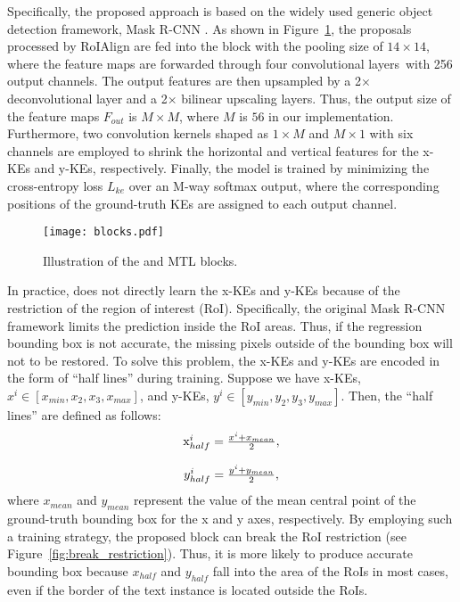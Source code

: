 \def\x{$\times$\xspace}

Specifically, the proposed approach is based on the widely used generic object detection framework, Mask R-CNN \cite{he2017mask}. As shown in Figure~\ref{fig:mtl_blocks}, the proposals processed by RoIAlign are fed into the \Ours block with the pooling size of $14\times 14$, where the feature maps are forwarded through four convolutional layers\ with 256 output channels. The output features are then upsampled by a 2\x deconvolutional layer and a 2\x bilinear upscaling layers. Thus, the output size of the feature maps $F_{out}$ is $M \times M$, where $M$ is $56$ in our implementation. 
Furthermore, two convolution kernels shaped as $1 \times M$ and $M \times 1$ with six channels are employed to shrink the horizontal and vertical features for the x-KEs and y-KEs, respectively. Finally, the \Ours model is trained by minimizing the cross-entropy loss $L_{ke}$ over an M-way softmax output, where the corresponding positions of the ground-truth KEs are assigned to each output channel. 


\begin{figure}[b!]
  \centering
  \texttt{[image: blocks.pdf]}
  \caption{Illustration of the \Ours and MTL blocks.}
  \label{fig:mtl_blocks}
\end{figure}


In practice, \Ours does not directly learn the x-KEs and y-KEs because of the restriction of the region of interest (RoI). Specifically, the original Mask R-CNN framework limits the prediction inside the RoI areas. Thus, if the regression bounding box is not accurate, the missing pixels outside of the bounding box will not to be restored. To solve this problem, the x-KEs and y-KEs are encoded in the form of ``half lines'' during training. Suppose we have x-KEs, $x^{i} \in [x_{min}, x_{2}, x_{3}, x_{max}]$, and y-KEs, $y^{i} \in  [y_{min}, y_{2}, y_{3}, y_{max}]$. Then, the ``half lines'' are defined as follows:
\begin{equation}
	\begin{array}{c}{\text x^{i}_{half} = \frac{x^{i} + x_{mean}}{2},} \\ \\
	y^{i}_{half} = \frac{y^{i} + y_{mean}}{2},\end{array}
\end{equation}
\noindent where $x_{mean}$ and $y_{mean}$ represent the value of the mean central point of the ground-truth bounding box for the x and y axes, respectively. By employing such a training strategy, the proposed \Ours block can break the RoI restriction (see Figure~\ref{fig:break_restriction}). Thus, it is more likely to produce accurate bounding box because $x_{half}$ and $y_{half}$ fall into the area of the RoIs in most cases, even if the border of the text instance is located outside the RoIs.

